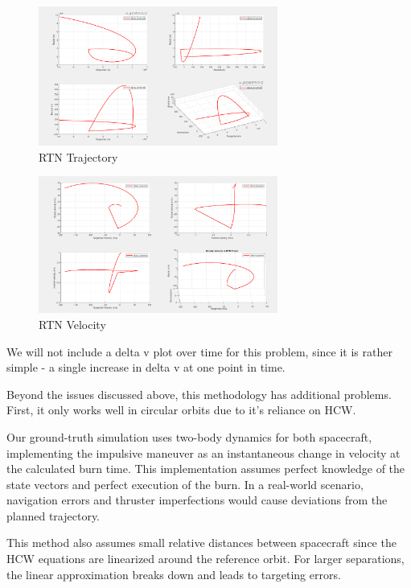 \begin{figure}[H]
    \centering
    \includegraphics[width=0.7\textwidth]{PS6/Figures/trajectory.png}
    \caption{RTN Trajectory}
    \label{fig:hcw_velocity}
\end{figure}

\begin{figure}[H]
    \centering
    \includegraphics[width=0.7\textwidth]{PS6/Figures/velocity.png}
    \caption{RTN Velocity}
    \label{fig:hcw_velocity}
\end{figure}

We will not include a delta v plot over time for this problem, since it is rather simple - a single increase in delta v at one point in time.

Beyond the issues discussed above, this methodology has additional problems. First, it only works well in circular orbits due to it's reliance on HCW.

Our ground-truth simulation uses two-body dynamics for both spacecraft, implementing the impulsive maneuver as an instantaneous change in velocity at the calculated burn time. This implementation assumes perfect knowledge of the state vectors and perfect execution of the burn. In a real-world scenario, navigation errors and thruster imperfections would cause deviations from the planned trajectory.

This method also assumes small relative distances between spacecraft since the HCW equations are linearized around the reference orbit. For larger separations, the linear approximation breaks down and leads to targeting errors.

